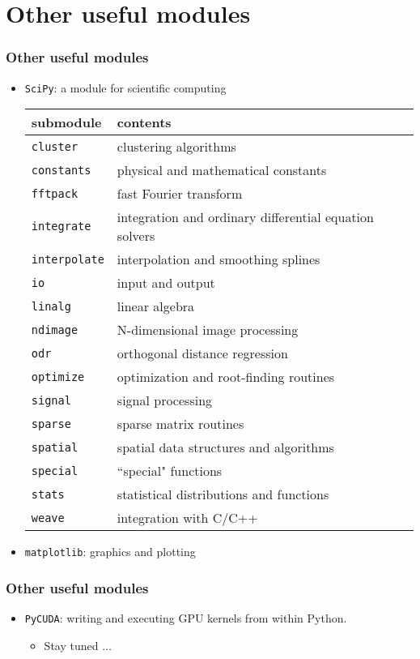 \documentclass[handout]{beamer}
\numberwithin{equation}{section}
\begin{document}
\section{Other useful modules}
\begin{frame}
\frametitle{Other useful modules}
\scriptsize
\begin{itemize}
\item {\tt SciPy}: a module for scientific computing

\begin{center}
\begin{tabular}{l|l}
submodule & contents \\ \hline
{\tt cluster} & clustering algorithms \\
{\tt constants} & physical and mathematical constants \\
{\tt fftpack} & fast Fourier transform \\
{\tt integrate} & integration and ordinary differential equation solvers \\
{\tt interpolate} & interpolation and smoothing splines \\
{\tt io} & input and output \\
{\tt linalg} & linear algebra \\
{\tt ndimage} & N-dimensional image processing \\
{\tt odr} & orthogonal distance regression \\
{\tt optimize} & optimization and root-finding routines \\
{\tt signal} & signal processing \\
{\tt sparse} & sparse matrix routines \\
{\tt spatial}	 & spatial data structures and algorithms \\
{\tt special} & ``special" functions \\
{\tt stats} & statistical distributions and functions \\
{\tt weave} & integration with C/C++
\end{tabular}
\end{center}

\pause \item {\tt matplotlib}: graphics and plotting
\end{itemize}
\end{frame}

\begin{frame}
\frametitle{Other useful modules}
\begin{itemize}
\item {\tt PyCUDA}: writing and executing GPU kernels from within Python.
\begin{itemize}
\pause \item Stay tuned $\ldots$
\end{itemize}
\end{itemize}
\end{frame}
\end{document}
